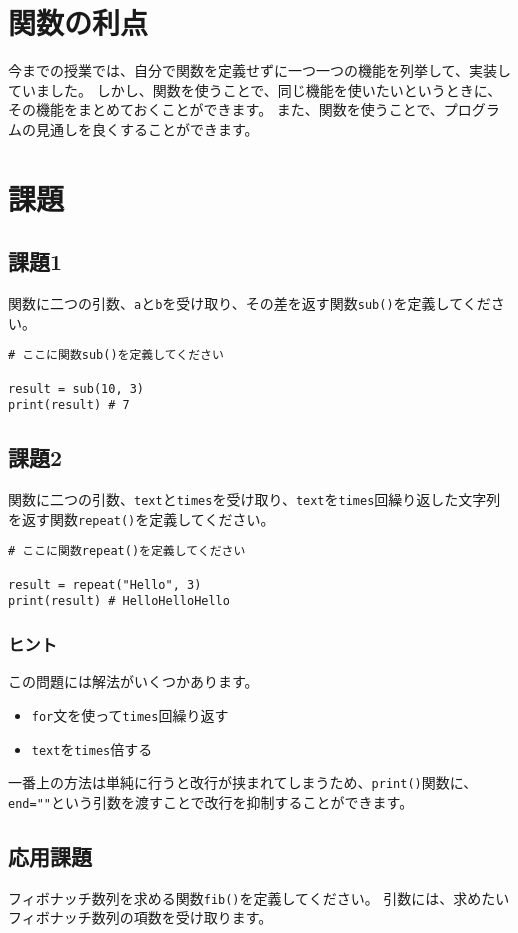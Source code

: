 \documentclass[a4paper,titlepage,dvipdfmx]{jarticle}
\begin{document}
\section{関数の利点}
今までの授業では、自分で関数を定義せずに一つ一つの機能を列挙して、実装していました。
しかし、関数を使うことで、同じ機能を使いたいというときに、その機能をまとめておくことができます。
また、関数を使うことで、プログラムの見通しを良くすることができます。

\section{課題}
\subsection*{課題1}
関数に二つの引数、\texttt{a}と\texttt{b}を受け取り、その差を返す関数\texttt{sub()}を定義してください。
\begin{lstlisting}[caption=課題1,label=課題1]
# ここに関数sub()を定義してください

result = sub(10, 3)
print(result) # 7
\end{lstlisting}

\subsection*{課題2}
関数に二つの引数、\texttt{text}と\texttt{times}を受け取り、\texttt{text}を\texttt{times}回繰り返した文字列を返す関数\texttt{repeat()}を定義してください。
\begin{lstlisting}[caption=課題2,label=課題2]
# ここに関数repeat()を定義してください

result = repeat("Hello", 3)
print(result) # HelloHelloHello
\end{lstlisting}
\subsubsection*{ヒント}
この問題には解法がいくつかあります。
\begin{itemize}
  \item \texttt{for}文を使って\texttt{times}回繰り返す
  \item \texttt{text}を\texttt{times}倍する
\end{itemize}
一番上の方法は単純に行うと改行が挟まれてしまうため、\texttt{print()}関数に、\texttt{end=""}という引数を渡すことで改行を抑制することができます。

\subsection*{応用課題}
フィボナッチ数列を求める関数\texttt{fib()}を定義してください。
引数には、求めたいフィボナッチ数列の項数を受け取ります。
\end{document}
